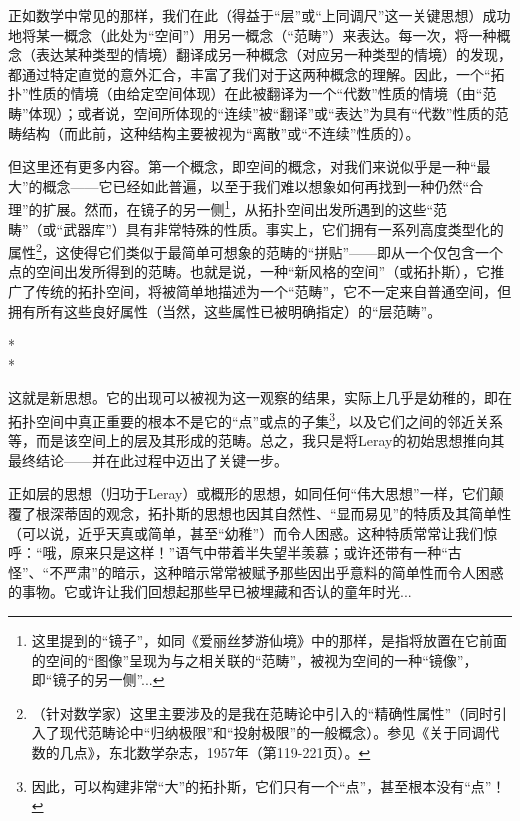 正如数学中常见的那样，我们在此（得益于“层”或“上同调尺”这一关键思想）成功地将某一概念（此处为“空间”）用另一概念（“范畴”）来表达。每一次，将一种概念（表达某种类型的情境）翻译成另一种概念（对应另一种类型的情境）的发现，都通过特定直觉的意外汇合，丰富了我们对于这两种概念的理解。因此，一个“拓扑”性质的情境（由给定空间体现）在此被翻译为一个“代数”性质的情境（由“范畴”体现）；或者说，空间所体现的“连续”被“翻译”或“表达”为具有“代数”性质的范畴结构（而此前，这种结构主要被视为“离散”或“不连续”性质的）。

但这里还有更多内容。第一个概念，即空间的概念，对我们来说似乎是一种“最大”的概念——它已经如此普遍，以至于我们难以想象如何再找到一种仍然“合理”的扩展。然而，在镜子的另一侧\footnote{这里提到的“镜子”，如同《爱丽丝梦游仙境》中的那样，是指将放置在它前面的空间的“图像”呈现为与之相关联的“范畴”，被视为空间的一种“镜像”，即“镜子的另一侧”...}，从拓扑空间出发所遇到的这些“范畴”（或“武器库”）具有非常特殊的性质。事实上，它们拥有一系列高度类型化的属性\footnote{（针对数学家）这里主要涉及的是我在范畴论中引入的“精确性属性”（同时引入了现代范畴论中“归纳极限”和“投射极限”的一般概念）。参见《关于同调代数的几点》，东北数学杂志，1957年（第119-221页）。}，这使得它们类似于最简单可想象的范畴的“拼贴”——即从一个仅包含一个点的空间出发所得到的范畴。也就是说，一种“新风格的空间”（或拓扑斯），它推广了传统的拓扑空间，将被简单地描述为一个“范畴”，它不一定来自普通空间，但拥有所有这些良好属性（当然，这些属性已被明确指定）的“层范畴”。

\begin{center}
    * \quad * \\
    *
    \end{center}

这就是新思想。它的出现可以被视为这一观察的结果，实际上几乎是幼稚的，即在拓扑空间中真正重要的根本不是它的“点”或点的子集\footnote{因此，可以构建非常“大”的拓扑斯，它们只有一个“点”，甚至根本没有“点”！}，以及它们之间的邻近关系等，而是该空间上的层及其形成的范畴。总之，我只是将Leray的初始思想推向其最终结论——并在此过程中迈出了关键一步。

正如层的思想（归功于Leray）或概形的思想，如同任何“伟大思想”一样，它们颠覆了根深蒂固的观念，拓扑斯的思想也因其自然性、“显而易见”的特质及其简单性（可以说，近乎天真或简单，甚至“幼稚”）而令人困惑。这种特质常常让我们惊呼：“哦，原来只是这样！”语气中带着半失望半羡慕；或许还带有一种“古怪”、“不严肃”的暗示，这种暗示常常被赋予那些因出乎意料的简单性而令人困惑的事物。它或许让我们回想起那些早已被埋藏和否认的童年时光...